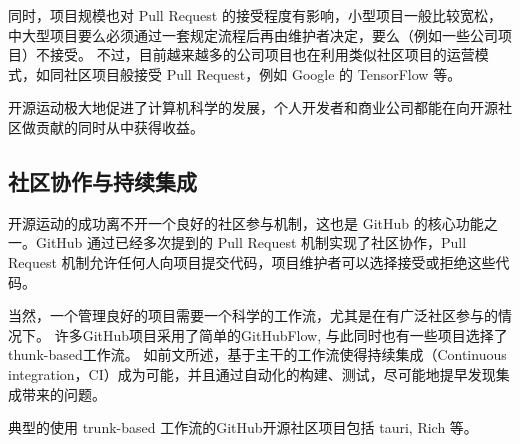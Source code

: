 \documentclass[../main.tex]{subfiles}
\begin{document}
同时，项目规模也对 Pull Request 的接受程度有影响，小型项目一般比较宽松，中大型项目要么必须通过一套规定流程后再由维护者决定，要么（例如一些公司项目）不接受。
不过，目前越来越多的公司项目也在利用类似社区项目的运营模式，如同社区项目般接受 Pull Request，例如 Google 的 TensorFlow 等。

开源运动极大地促进了计算机科学的发展，个人开发者和商业公司都能在向开源社区做贡献的同时从中获得收益。

\subsection{社区协作与持续集成}

开源运动的成功离不开一个良好的社区参与机制，这也是 GitHub 的核心功能之一。GitHub 通过已经多次提到的 Pull Request 机制实现了社区协作，Pull Request 机制允许任何人向项目提交代码，项目维护者可以选择接受或拒绝这些代码。

当然，一个管理良好的项目需要一个科学的工作流，尤其是在有广泛社区参与的情况下。
许多GitHub项目采用了简单的GitHubFlow, 与此同时也有一些项目选择了thunk-based工作流。
如前文所述，基于主干的工作流使得持续集成（Continuous integration，CI）成为可能，并且通过自动化的构建、测试，尽可能地提早发现集成带来的问题。

典型的使用 trunk-based 工作流的GitHub开源社区项目包括 tauri, Rich 等。
\end{document}
